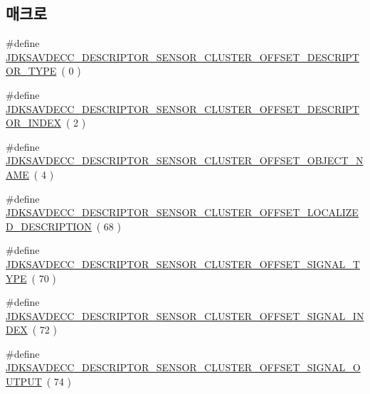 \subsection*{매크로}
\begin{DoxyCompactItemize}
\item 
\#define \hyperlink{group__descriptor__sensor__cluster_ga017972c3ad6cc0673b158292846c89f2}{J\+D\+K\+S\+A\+V\+D\+E\+C\+C\+\_\+\+D\+E\+S\+C\+R\+I\+P\+T\+O\+R\+\_\+\+S\+E\+N\+S\+O\+R\+\_\+\+C\+L\+U\+S\+T\+E\+R\+\_\+\+O\+F\+F\+S\+E\+T\+\_\+\+D\+E\+S\+C\+R\+I\+P\+T\+O\+R\+\_\+\+T\+Y\+PE}~( 0 )
\item 
\#define \hyperlink{group__descriptor__sensor__cluster_ga88884e4b012650169f7a0aa4b32c6cc0}{J\+D\+K\+S\+A\+V\+D\+E\+C\+C\+\_\+\+D\+E\+S\+C\+R\+I\+P\+T\+O\+R\+\_\+\+S\+E\+N\+S\+O\+R\+\_\+\+C\+L\+U\+S\+T\+E\+R\+\_\+\+O\+F\+F\+S\+E\+T\+\_\+\+D\+E\+S\+C\+R\+I\+P\+T\+O\+R\+\_\+\+I\+N\+D\+EX}~( 2 )
\item 
\#define \hyperlink{group__descriptor__sensor__cluster_ga1726cfeee51b207d3c9a4b2500f7db97}{J\+D\+K\+S\+A\+V\+D\+E\+C\+C\+\_\+\+D\+E\+S\+C\+R\+I\+P\+T\+O\+R\+\_\+\+S\+E\+N\+S\+O\+R\+\_\+\+C\+L\+U\+S\+T\+E\+R\+\_\+\+O\+F\+F\+S\+E\+T\+\_\+\+O\+B\+J\+E\+C\+T\+\_\+\+N\+A\+ME}~( 4 )
\item 
\#define \hyperlink{group__descriptor__sensor__cluster_ga5772c79a02def2f05e3914924f04128f}{J\+D\+K\+S\+A\+V\+D\+E\+C\+C\+\_\+\+D\+E\+S\+C\+R\+I\+P\+T\+O\+R\+\_\+\+S\+E\+N\+S\+O\+R\+\_\+\+C\+L\+U\+S\+T\+E\+R\+\_\+\+O\+F\+F\+S\+E\+T\+\_\+\+L\+O\+C\+A\+L\+I\+Z\+E\+D\+\_\+\+D\+E\+S\+C\+R\+I\+P\+T\+I\+ON}~( 68 )
\item 
\#define \hyperlink{group__descriptor__sensor__cluster_gad1bcd9160009e2f4edbe096fd6fbc4e2}{J\+D\+K\+S\+A\+V\+D\+E\+C\+C\+\_\+\+D\+E\+S\+C\+R\+I\+P\+T\+O\+R\+\_\+\+S\+E\+N\+S\+O\+R\+\_\+\+C\+L\+U\+S\+T\+E\+R\+\_\+\+O\+F\+F\+S\+E\+T\+\_\+\+S\+I\+G\+N\+A\+L\+\_\+\+T\+Y\+PE}~( 70 )
\item 
\#define \hyperlink{group__descriptor__sensor__cluster_gaa37b0b4ed3e92203cd9253d17ac0befa}{J\+D\+K\+S\+A\+V\+D\+E\+C\+C\+\_\+\+D\+E\+S\+C\+R\+I\+P\+T\+O\+R\+\_\+\+S\+E\+N\+S\+O\+R\+\_\+\+C\+L\+U\+S\+T\+E\+R\+\_\+\+O\+F\+F\+S\+E\+T\+\_\+\+S\+I\+G\+N\+A\+L\+\_\+\+I\+N\+D\+EX}~( 72 )
\item 
\#define \hyperlink{group__descriptor__sensor__cluster_ga06915f04faf4342b157c29b73cbad4a5}{J\+D\+K\+S\+A\+V\+D\+E\+C\+C\+\_\+\+D\+E\+S\+C\+R\+I\+P\+T\+O\+R\+\_\+\+S\+E\+N\+S\+O\+R\+\_\+\+C\+L\+U\+S\+T\+E\+R\+\_\+\+O\+F\+F\+S\+E\+T\+\_\+\+S\+I\+G\+N\+A\+L\+\_\+\+O\+U\+T\+P\+UT}~( 74 )
\item 

\end{DoxyCompactItemize}
